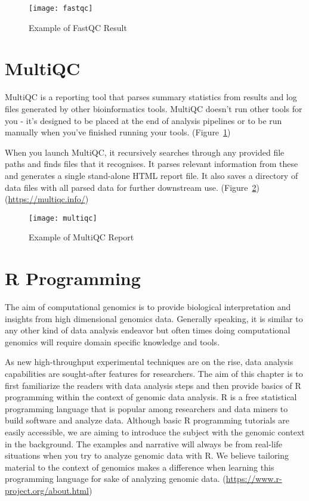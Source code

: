 \begin{figure}
	\centering
	\texttt{[image: fastqc]}
	\caption{Example of FastQC Result}
	\label{fig:fastqc}
\end{figure} 

\section{MultiQC} 
MultiQC is a reporting tool that parses summary statistics from results and log files generated by other bioinformatics tools. MultiQC doesn't run other tools for you - it's designed to be placed at the end of analysis pipelines or to be run manually when you've finished running your tools. (Figure~\ref{fig:fastqc})

When you launch MultiQC, it recursively searches through any provided file paths and finds files that it recognises. It parses relevant information from these and generates a single stand-alone HTML report file. It also saves a directory of data files with all parsed data for further downstream use. (Figure~\ref{fig:multiqc}) (\url{https://multiqc.info/}) 

\begin{figure}
	\centering
	\texttt{[image: multiqc]}
	\caption{Example of MultiQC Report}
	\label{fig:multiqc}
\end{figure} 


\section{R Programming}
The aim of computational genomics is to provide biological interpretation and insights from high dimensional genomics data. Generally speaking, it is similar to any other kind of data analysis endeavor but often times doing computational genomics will require domain specific knowledge and tools.

As new high-throughput experimental techniques are on the rise, data analysis capabilities are sought-after features for researchers. The aim of this chapter is to first familiarize the readers with data analysis steps and then provide basics of R programming within the context of genomic data analysis. R is a free statistical programming language that is popular among researchers and data miners to build software and analyze data. Although basic R programming tutorials are easily accessible, we are aiming to introduce the subject with the genomic context in the background. The examples and narrative will always be from real-life situations when you try to analyze genomic data with R. We believe tailoring material to the context of genomics makes a difference when learning this programming language for sake of analyzing genomic data. (\url{https://www.r-project.org/about.html})



